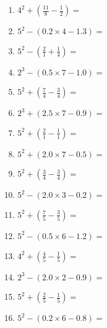 \documentclass[12pt]{article}
\begin{document}
\begin{enumerate}
\item \large $ 4^{2} + (\frac{11}{8} - \frac{1}{2}) = $ \vspace{1.6cm}
\item \large $ 5^{2} - (0.2 \times 4 - 1.3) = $ \vspace{1.6cm}
\item \large $ 5^{2} - (\frac{2}{1} + \frac{1}{4}) = $ \vspace{1.6cm}
\item \large $ 2^{3} - (0.5 \times 7 - 1.0) = $ \vspace{1.6cm}
\item \large $ 5^{2} + (\frac{7}{4} - \frac{3}{4}) = $ \vspace{1.6cm}
\item \large $ 2^{3} + (2.5 \times 7 - 0.9) = $ \vspace{1.6cm}
\newpage
\item \large $ 5^{2} + (\frac{2}{1} - \frac{1}{1}) = $ \vspace{1.6cm}
\item \large $ 5^{2} + (2.0 \times 7 - 0.5) = $ \vspace{1.6cm}
\item \large $ 5^{2} + (\frac{3}{4} - \frac{3}{4}) = $ \vspace{1.6cm}
\item \large $ 5^{2} - (2.0 \times 3 - 0.2) = $ \vspace{1.6cm}
\item \large $ 5^{2} + (\frac{7}{5} - \frac{3}{5}) = $ \vspace{1.6cm}
\item \large $ 5^{2} - (0.5 \times 6 - 1.2) = $ \vspace{1.6cm}
\item \large $ 4^{2} + (\frac{4}{5} - \frac{1}{5}) = $ \vspace{1.6cm}
\item \large $ 2^{3} - (2.0 \times 2 - 0.9) = $ \vspace{1.6cm}
\item \large $ 5^{2} + (\frac{2}{5} - \frac{1}{5}) = $ \vspace{1.6cm}
\item \large $ 5^{2} - (0.2 \times 6 - 0.8) = $ \vspace{1.6cm}
\end{enumerate}\newpage
\end{document}
